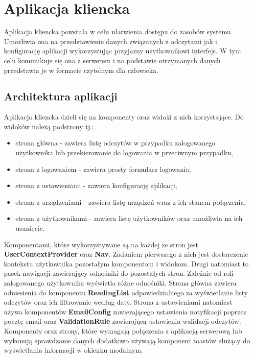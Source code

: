 \section{Aplikacja kliencka}
Aplikacja kliencka powstała w celu ułatwienia dostępu do zasobów systemu.
Umożliwia ona na przedstawienie danych związanych z odczytami jak i konfigurację
aplikacji wykorzystując przyjazny użytkownikowi interfejs. W tym celu komunikuje
się ona z serwerem i na podstawie otrzymanych danych przedstawia je w formacie
czytelnym dla człowieka. 

\subsection{Architektura aplikacji}
Aplikacja kliencka dzieli się na komponenty oraz widoki z nich korzystające.
Do widoków należą podstrony tj.:
\begin{itemize}
  \item strona główna - zawiera listę odczytów w przypadku zalogowanego użytkownika
    lub przekierowanie do logowania w przeciwnym przypadku,
  \item strona z logowaniem - zawiera prosty formularz logowania,
  \item strona z ustawieniami - zawiera konfigurację aplikacji,
  \item strona z urządzeniami - zawiera listę urządzeń wraz z ich stanem połączenia,
  \item strona z użytkownikami - zawiera listę użytkowników oraz umożliwia na ich usunięcie.
\end{itemize}
Komponentami, które wykorzystywane są na każdej ze stron jest \textbf{UserContextProvider}
oraz \textbf{Nav}.
Zadaniem pierwszego z nich jest dostarczenie kontekstu użytkownika pozostałym komponentom i 
widokom. Drugi natomiast to pasek nawigacji zawierający odnośniki do pozostałych stron.
Zależnie od roli zalogowanego użytkownika wyświetla różne odnośniki.
Strona główna zawiera odniesienia do komponentu \textbf{ReadingList} odpowiedzialnego
za wyświetlanie listy odczytów oraz ich filtrowanie według daty.
Strona z ustawieniami natomiast używa komponentów \textbf{EmailConfig} zawierającego
ustawienia notyfikacji poprzez pocztę email oraz \textbf{ValidationRule} 
zawierającą ustawienia walidacji odczytów. Komponenty oraz strony, które
wymagają połączenia z aplikacją serwerową lub wykonują sprawdzanie danych
dodatkowo używają komponent toastów służący do wyświetlania informacji w okienku modalnym.

